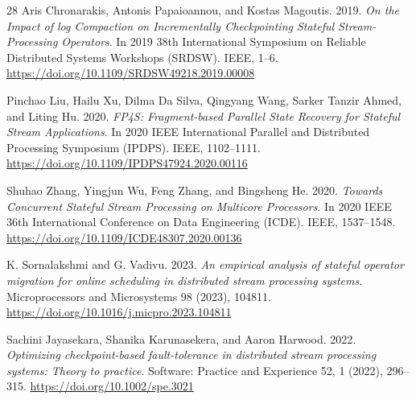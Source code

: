 \documentclass[sigconf]{acmart}
\begin{document}
\begin{thebibliography}{28}
Aris Chronarakis, Antonis Papaioannou, and Kostas Magoutis.
2019.
\textit{On the Impact of log Compaction on Incrementally Checkpointing Stateful Stream-Processing Operators}.
In 2019 38th International Symposium on Reliable Distributed Systems Workshops (SRDSW). IEEE, 1--6.
\url{https://doi.org/10.1109/SRDSW49218.2019.00008}

Pinchao Liu, Hailu Xu, Dilma Da Silva, Qingyang Wang, Sarker Tanzir Ahmed, and Liting Hu.
2020.
\textit{FP4S: Fragment-based Parallel State Recovery for Stateful Stream Applications}.
In 2020 IEEE International Parallel and Distributed Processing Symposium (IPDPS). IEEE, 1102--1111.
\url{https://doi.org/10.1109/IPDPS47924.2020.00116}

Shuhao Zhang, Yingjun Wu, Feng Zhang, and Bingsheng He.
2020.
\textit{Towards Concurrent Stateful Stream Processing on Multicore Processors}.
In 2020 IEEE 36th International Conference on Data Engineering (ICDE). IEEE, 1537--1548.
\url{https://doi.org/10.1109/ICDE48307.2020.00136}

K. Sornalakshmi and G. Vadivu.
2023.
\textit{An empirical analysis of stateful operator migration for online scheduling in distributed stream processing systems}.
Microprocessors and Microsystems 98 (2023), 104811.
\url{https://doi.org/10.1016/j.micpro.2023.104811}

Sachini Jayasekara, Shanika Karunasekera, and Aaron Harwood.
2022.
\textit{Optimizing checkpoint-based fault-tolerance in distributed stream processing systems: Theory to practice}.
Software: Practice and Experience 52, 1 (2022), 296--315.
\url{https://doi.org/10.1002/spe.3021}

\end{thebibliography}
\end{document}
